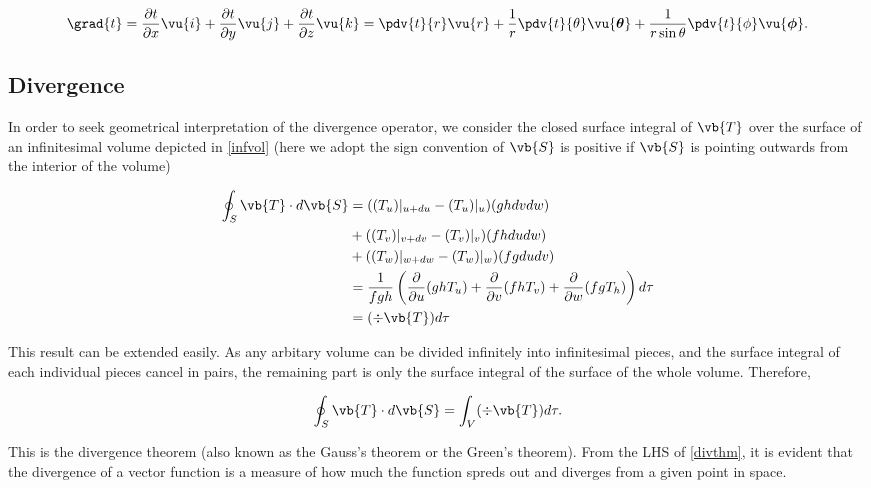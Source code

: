 \documentclass[english,a4paper,12pt]{report}
\begin{document}
\begin{equation} 
	\grad{t} = \frac{\partial t}{\partial x} \vu{i} + \frac{\partial t}{\partial y} \vu{j} + \frac{\partial t}{\partial z} \vu{k} = \pdv{t}{r}\vu{r} + \frac{1}{r}\pdv{t}{\theta}\vu{\boldsymbol{\theta } } + \frac{1}{r\sin{\theta}}\pdv{t}{\phi}\vu{\boldsymbol{\phi } }. 
\end{equation}
	
\subsection{Divergence}

	
In order to seek geometrical interpretation of the divergence operator, we consider the closed surface integral of \(\vb{T}\) over the surface of an infinitesimal volume depicted in \cref{infvol} (here we adopt the sign convention of \(\vb{S}\) is positive if \(\vb{S}\) is pointing outwards from the interior of the volume)

\begin{equation} \label{divpre} 
	\begin{aligned} 
    \oint_{S} \vb{T} \cdot d\vb{S} &= ((T_u)|_{u+du} - (T_u)|_{u})(ghdvdw) \\ &+ ((T_v)|_{v+dv} - (T_v)|_{v})(fhdudw) \\ &+ ((T_w)|_{w+dw} - (T_w)|_{w})(fgdudv) \\
    &= \frac{1}{fgh} \left( 
		\frac{\partial}{\partial u} (ghT_{u} ) + 
		\frac{\partial}{\partial v} (fhT_{v} )+ 
		\frac{\partial}{\partial w} (fgT_{h} ) \right) d\tau \\
	&= (\div{\vb{T}}) d\tau
    \end{aligned} 
\end{equation} 
	
This result can be extended easily. As any arbitary volume can be divided infinitely into infinitesimal pieces, and the surface integral of each individual pieces cancel in pairs, the remaining part is only the surface integral of the surface of the whole volume. Therefore,
	
\begin{equation} 
	\oint_{S} \vb{T} \cdot d\vb{S} = \int_{V}(\div{\vb{T} }) d\tau \label{divthm}.  
\end{equation}
	
This is the divergence theorem (also known as the Gauss's theorem or the Green's theorem). From the LHS of \cref{divthm}, it is evident that the divergence of a vector function is a measure of how much the function spreds out and diverges from a given point in space.
\end{document}
